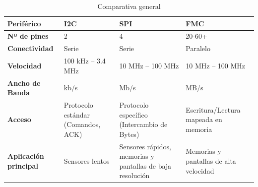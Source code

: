 \documentclass[../main.tex]{subfiles}
\begin{document}
        \begin{table}[h!]
            \centering
            \small
            \begin{tabular}{l p{3.2cm} p{3.5cm} p{4.2cm}}
                \hline
                \textbf{Periférico} & \textbf{I2C} & \textbf{SPI} & \textbf{FMC} \\ \hline
                \textbf{Nº de pines} & 2 & 4 & 20-60+ \\
                \textbf{Conectividad} & Serie & Serie & Paralelo \\
                \textbf{Velocidad} & 100 kHz -- 3.4 MHz & 10 MHz -- 100 MHz & 10 MHz -- 100 MHz \\
                \textbf{Ancho de Banda} & kb/s & Mb/s & MB/s \\ 
                \textbf{Acceso} & Protocolo estándar (Comandos, ACK) & Protocolo específico (Intercambio de Bytes) & Escritura/Lectura mapeada en memoria \\
                \textbf{Aplicación principal} & Sensores lentos & Sensores rápidos, memorias y pantallas de baja resolución & Memorias y pantallas de alta velocidad\\ \hline
            \end{tabular}
            \caption{Comparativa general}
            \label{tab:buses_comparison}
        \end{table}
\end{document}
